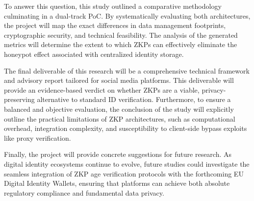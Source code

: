 \documentclass [english]{hogent-article}
\begin{document}
    To answer this question, this study outlined a comparative methodology culminating in a dual-track PoC. By systematically evaluating both architectures, the project will map the exact differences in data management footprints, cryptographic security, and technical feasibility. The analysis of the generated metrics will determine the extent to which ZKPs can effectively eliminate the honeypot effect associated with centralized identity storage.
    
    The final deliverable of this research will be a comprehensive technical framework and advisory report tailored for social media platforms. This deliverable will provide an evidence-based verdict on whether ZKPs are a viable, privacy-preserving alternative to standard ID verification. Furthermore, to ensure a balanced and objective evaluation, the conclusion of the study will explicitly outline the practical limitations of ZKP architectures, such as computational overhead, integration complexity, and susceptibility to client-side bypass exploits like proxy verification. 
    
    Finally, the project will provide concrete suggestions for future research. As digital identity ecosystems continue to evolve, future studies could investigate the seamless integration of ZKP age verification protocols with the forthcoming EU Digital Identity Wallets, ensuring that platforms can achieve both absolute regulatory compliance and fundamental data privacy.
    
\printbibliography[heading=bibintoc]
\end{document}
